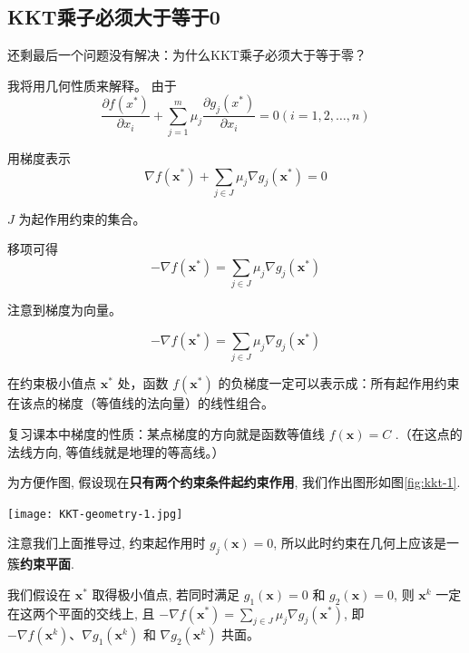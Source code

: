 \subsection{KKT乘子必须大于等于0}

\begin{problem}
    还剩最后一个问题没有解决：为什么KKT乘子必须大于等于零？
\end{problem}

我将用几何性质来解释。 由于
$$
\frac{\partial f\left(x^{*}\right)}{\partial x_{i}}+\sum_{j=1}^{m} \mu_{j} \frac{\partial g_{j}\left(x^{*}\right)}{\partial x_{i}}=0(i=1,2, \ldots, n)
$$

用梯度表示 $$ \nabla f\left(\mathbf{x}^{*}\right)+\sum_{j \in J} \mu_{j} \nabla g_{j}\left(\mathbf{x}^{*}\right)=0$$

$J$ 为起作用约束的集合。

移项可得 $$ -\nabla f\left(\mathbf{x}^{*}\right)=\sum_{j \in J} \mu_{j} \nabla g_{j}\left(\mathbf{x}^{*}\right) $$

注意到梯度为向量。 

\begin{theorem}
    $$ -\nabla f\left(\mathbf{x}^{*}\right)=\sum_{j \in J} \mu_{j} \nabla g_{j}\left(\mathbf{x}^{*}\right) $$

    在约束极小值点 $ \mathbf{x}^{*} $ 处，函数 $ f\left(\mathbf{x}^{*}\right) $ 的负梯度一定可以表示成：所有起作用约束在该点的梯度（等值线的法向量）的线性组合。
\end{theorem}


\begin{corollary}[梯度的性质]
    复习课本中梯度的性质：某点梯度的方向就是函数等值线 $ f(\mathbf{x})=C $ .（在这点的法线方向, 等值线就是地理的等高线。）
\end{corollary}

为方便作图, 假设现在\textbf{只有两个约束条件起约束作用}, 我们作出图形如图\ref{fig:kkt-1}.

\begin{FigureCenter}{}
    \label{fig:kkt-1}
    \texttt{[image: KKT-geometry-1.jpg]}
\end{FigureCenter}


注意我们上面推导过, 约束起作用时 $ g_{j}(\mathbf{x})=0 $, 所以此时约束在几何上应该是一簇\textbf{约束平面}.

我们假设在 $ \mathbf{x}^{*} $ 取得极小值点, 若同时满足 $ g_{1}(\mathbf{x})=0 $ 和 $ g_{2}(\mathbf{x})=0 $, 则 $ \mathbf{x}^{k} $ 一定在这两个平面的交线上, 且 $ -\nabla f\left(\mathbf{x}^{*}\right)=\sum_{j \in J} \mu_{j} \nabla g_{j}\left(\mathbf{x}^{*}\right) $, 即 $ -\nabla f\left(\mathbf{x}^{k}\right) 、 \nabla g_{1}\left(\mathbf{x}^{k}\right) $ 和 $ \nabla g_{2}\left(\mathbf{x}^{k}\right) $ 共面。

